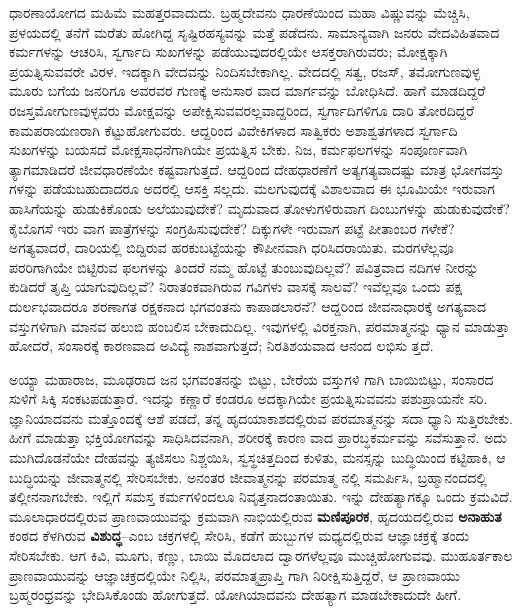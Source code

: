 ಧಾರಣಾಯೋಗದ ಮಹಿಮೆ ಮಹತ್ತರವಾದುದು. ಬ್ರಹ್ಮದೇವನು ಧಾರಣೆಯಿಂದ ಮಹಾ ವಿಷ್ಣುವನ್ನು ಮೆಚ್ಚಿಸಿ, ಪ್ರಳಯದಲ್ಲಿ ತನೆಗೆ ಮರೆತು ಹೋಗಿದ್ದ ಸೃಷ್ಟಿರಹಸ್ಯವನ್ನು ಮತ್ತೆ ಪಡೆದನು. ಸಾಮಾನ್ಯವಾಗಿ ಜನರು ವೇದವಿಹಿತವಾದ ಕರ್ಮಗಳನ್ನು ಆಚರಿಸಿ, ಸ್ವರ್ಗಾದಿ ಸುಖಗಳನ್ನು ಪಡೆಯುವುದರಲ್ಲಿಯೇ ಆಸಕ್ತರಾಗಿರುವರು; ಮೋಕ್ಷಕ್ಕಾಗಿ ಪ್ರಯತ್ನಿಸುವವರೇ ವಿರಳ. ಇದಕ್ಕಾಗಿ ವೇದವನ್ನು ನಿಂದಿಸಬೇಕಾಗಿಲ್ಲ. ವೇದದಲ್ಲಿ ಸತ್ವ, ರಜಸ್, ತಮೋಗುಣವುಳ್ಳ ಮೂರು ಬಗೆಯ ಜನರಿಗೂ ಅವರವರ ಗುಣಕ್ಕೆ ಅನುಸಾರ ವಾದ ಮಾರ್ಗವನ್ನು ಬೋಧಿಸಿದೆ. ಹಾಗೆ ಮಾಡದಿದ್ದರೆ ರಜಸ್ತಮೋಗುಣವುಳ್ಳವರು ಮೋಕ್ಷವನ್ನು ಅಪೇಕ್ಷಿಸುವವರಲ್ಲವಾದ್ದರಿಂದ, ಸ್ವರ್ಗಾದಿಗಳಿಗೂ ದಾರಿ ತೋರದಿದ್ದರೆ ಕಾಮಪರಾಯಣರಾಗಿ ಕೆಟ್ಟುಹೋಗುವರು. ಆದ್ದರಿಂದ ವಿವೇಕಿಗಳಾದ ಸಾತ್ವಿಕರು ಅಶಾಶ್ವತಗಳಾದ ಸ್ವರ್ಗಾದಿ ಸುಖಗಳನ್ನು ಬಯಸದೆ ಮೋಕ್ಷಸಾಧನೆಗಾಗಿಯೇ ಪ್ರಯತ್ನಿಸ ಬೇಕು. ನಿಜ, ಕರ್ಮಫಲಗಳನ್ನು ಸಂಪೂರ್ಣವಾಗಿ ತ್ಯಾಗಮಾಡಿದರೆ ಜೀವಧಾರಣೆಯೇ ಕಷ್ಟವಾಗುತ್ತದೆ. ಆದ್ದರಿಂದ ದೇಹಧಾರಣೆಗೆ ಅತ್ಯಗತ್ಯವಾದಷ್ಟು ಮಾತ್ರ ಭೋಗವಸ್ತು ಗಳನ್ನು ಪಡೆಯಬಹುದಾದರೂ ಅದರಲ್ಲಿ ಆಸಕ್ತಿ ಸಲ್ಲದು. ಮಲಗುವುದಕ್ಕೆ ವಿಶಾಲವಾದ ಈ ಭೂಮಿಯೇ ಇರುವಾಗ ಹಾಸಿಗೆಯನ್ನು ಹುಡುಕಿಕೊಂಡು ಅಲೆಯುವುದೇಕೆ? ಮೃದುವಾದ ತೋಳುಗಳಿರುವಾಗ ದಿಂಬುಗಳನ್ನು ಹುಡುಕುವುದೇಕೆ? ಕೈಬೊಗಸೆ ಇರು ವಾಗ ಪಾತ್ರೆಗಳನ್ನು ಸಂಗ್ರಹಿಸುವುದೇಕೆ? ದಿಕ್ಕುಗಳೇ ಇರುವಾಗ ಪಟ್ಟೆ ಪೀತಾಂಬರ ಗಳೇಕೆ? ಅಗತ್ಯವಾದರೆ, ದಾರಿಯಲ್ಲಿ ಬಿದ್ದಿರುವ ಹರಕುಬಟ್ಟೆಯನ್ನು ಕೌಪೀನವಾಗಿ ಧರಿಸಿದರಾಯಿತು. ಮರಗಳೆಲ್ಲವೂ ಪರರಿಗಾಗಿಯೇ ಬಿಟ್ಟಿರುವ ಫಲಗಳನ್ನು ತಿಂದರೆ ನಮ್ಮ ಹೊಟ್ಟೆ ತುಂಬುವುದಿಲ್ಲವೆ? ಪವಿತ್ರವಾದ ನದಿಗಳ ನೀರನ್ನು ಕುಡಿದರೆ ತೃಪ್ತಿ ಯಾಗುವುದಿಲ್ಲವೆ? ನಿರಾತಂಕವಾಗಿರುವ ಗವಿಗಳು ವಾಸಕ್ಕೆ ಸಾಲವೆ? ಇವೆಲ್ಲವೂ ಒಂದು ಪಕ್ಷ ದುರ್ಲಭವಾದರೂ ಶರಣಾಗತ ರಕ್ಷಕನಾದ ಭಗವಂತನು ಕಾಪಾಡಲಾರನೆ? ಆದ್ದರಿಂದ ಜೀವನಾಧಾರಕ್ಕೆ ಅಗತ್ಯವಾದ ವಸ್ತುಗಳಿಗಾಗಿ ಮಾನವ ಹಲುಬಿ ಹಂಬಲಿಸ ಬೇಕಾದುದಿಲ್ಲ. ಇವುಗಳಲ್ಲಿ ವಿರಕ್ತನಾಗಿ, ಪರಮಾತ್ಮನನ್ನು ಧ್ಯಾನ ಮಾಡುತ್ತಾ ಹೋದರೆ, ಸಂಸಾರಕ್ಕೆ ಕಾರಣವಾದ ಅವಿದ್ಯೆ ನಾಶವಾಗುತ್ತದೆ; ನಿರತಿಶಯವಾದ ಆನಂದ ಲಭಿಸು ತ್ತದೆ. 

ಅಯ್ಯಾ ಮಹಾರಾಜ, ಮೂಢರಾದ ಜನ ಭಗವಂತನನ್ನು ಬಿಟ್ಟು, ಬೇರೆಯ ವಸ್ತುಗಳಿ ಗಾಗಿ ಬಾಯಿಬಿಟ್ಟು, ಸಂಸಾರದ ಸುಳಿಗೆ ಸಿಕ್ಕಿ ಸಂಕಟಪಡುತ್ತಾರೆ. ಇದನ್ನು ಕಣ್ಣಾರೆ ಕಂಡರೂ ಅದಕ್ಕಾಗಿಯೇ ಪ್ರಯತ್ನಿಸುವವನು ಪಶುಪ್ರಾಯನೇ ಸರಿ. ಜ್ಞಾನಿಯಾದವನು ಮತ್ತೊಂದಕ್ಕೆ ಆಶೆ ಪಡದೆ, ತನ್ನ ಹೃದಯಾಕಾಶದಲ್ಲಿರುವ ಪರಮಾತ್ಮನನ್ನು ಸದಾ ಧ್ಯಾನಿ ಸುತ್ತಿರಬೇಕು. ಹೀಗೆ ಮಾಡುತ್ತಾ ಭಕ್ತಿಯೋಗವನ್ನು ಸಾಧಿಸಿದವನಾಗಿ, ಶರೀರಕ್ಕೆ ಕಾರಣ ವಾದ ಪ್ರಾರಬ್ಧಕರ್ಮವನ್ನು ಸವೆಸುತ್ತಾನೆ. ಅದು ಮುಗಿದೊಡನೆಯೇ ದೇಹವನ್ನು ತ್ಯಜಿಸಲು ನಿಶ್ಚಯಿಸಿ, ಸ್ವಸ್ಥಚಿತ್ತದಿಂದ ಕುಳಿತು, ಮನಸ್ಸನ್ನು ಬುದ್ಧಿಯಿಂದ ಕಟ್ಟಿಹಾಕಿ, ಆ ಬುದ್ಧಿಯನ್ನು ಜೀವಾತ್ಮನಲ್ಲಿ ಸೇರಿಸಬೇಕು. ಅನಂತರ ಜೀವಾತ್ಮನನ್ನು ಪರಮಾತ್ಮ ನಲ್ಲಿ ಸಮರ್ಪಿಸಿ, ಬ್ರಹ್ಮಾನಂದದಲ್ಲಿ ತಲ್ಲೀನನಾಗಬೇಕು. ಇಲ್ಲಿಗೆ ಸಮಸ್ತ ಕರ್ಮಗಳಿಂದಲೂ ನಿವೃತ್ತನಾದಂತಾಯಿತು. ಇನ್ನು ದೇಹತ್ಯಾಗಕ್ಕೂ ಒಂದು ಕ್ರಮವಿದೆ. ಮೂಲಾಧಾರದಲ್ಲಿರುವ ಪ್ರಾಣವಾಯುವನ್ನು ಕ್ರಮವಾಗಿ ನಾಭಿಯಲ್ಲಿರುವ \textbf{ಮಣಿಪೂರಕ}, ಹೃದಯದಲ್ಲಿರುವ \textbf{ಅನಾಹುತ} ಕಂಠದ ಕೆಳಗಿರುವ \textbf{ವಿಶುದ್ಧ}–ಎಂಬ ಚಕ್ರಗಳಲ್ಲಿ ಸೇರಿಸಿ, ಕಡೆಗೆ ಹುಬ್ಬುಗಳ ಮಧ್ಯದಲ್ಲಿರುವ ಆಜ್ಞಾಚಕ್ರಕ್ಕೆ ತಂದು ಸೇರಿಸಬೇಕು. ಆಗ ಕಿವಿ, ಮೂಗು, ಕಣ್ಣು, ಬಾಯಿ ಮೊದಲಾದ ದ್ವಾರಗಳೆಲ್ಲವೂ ಮುಚ್ಚಿಹೋಗುವವು. ಮುಹೂರ್ತಕಾಲ ಪ್ರಾಣವಾಯುವನ್ನು ಆಜ್ಞಾಚಕ್ರದಲ್ಲಿಯೇ ನಿಲ್ಲಿಸಿ, ಪರಮಾತ್ಮಪ್ರಾಪ್ತಿ ಗಾಗಿ ನಿರೀಕ್ಷಿಸುತ್ತಿದ್ದರೆ, ಆ ಪ್ರಾಣವಾಯು ಬ್ರಹ್ಮರಂಧ್ರವನ್ನು ಭೇದಿಸಿಕೊಂಡು ಹೋಗುತ್ತದೆ. ಯೋಗಿಯಾದವನು ದೇಹತ್ಯಾಗ ಮಾಡಬೇಕಾದುದೇ ಹೀಗೆ.


